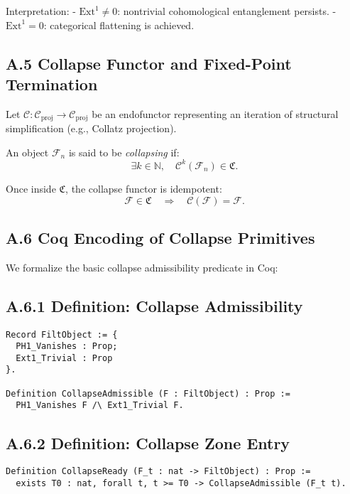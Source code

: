 \documentclass[11pt]{article}
\begin{document}
\noindent Interpretation:
- \( \mathrm{Ext}^1 \neq 0 \): nontrivial cohomological entanglement persists.
- \( \mathrm{Ext}^1 = 0 \): categorical flattening is achieved.

\subsection*{A.5 Collapse Functor and Fixed-Point Termination}

Let \( \mathcal{C} : \mathcal{C}_{\mathrm{proj}} \to \mathcal{C}_{\mathrm{proj}} \) be an endofunctor representing an iteration of structural simplification (e.g., Collatz projection).

An object \( \mathcal{F}_n \) is said to be \emph{collapsing} if:
\[
\exists k \in \mathbb{N}, \quad \mathcal{C}^k(\mathcal{F}_n) \in \mathfrak{C}.
\]

Once inside \( \mathfrak{C} \), the collapse functor is idempotent:
\[
\mathcal{F} \in \mathfrak{C} \quad \Rightarrow \quad \mathcal{C}(\mathcal{F}) = \mathcal{F}.
\]

\subsection*{A.6 Coq Encoding of Collapse Primitives}

We formalize the basic collapse admissibility predicate in Coq:

\subsection*{A.6.1 Definition: Collapse Admissibility}

\begin{lstlisting}[language=Coq]
Record FiltObject := {
  PH1_Vanishes : Prop;
  Ext1_Trivial : Prop
}.

Definition CollapseAdmissible (F : FiltObject) : Prop :=
  PH1_Vanishes F /\ Ext1_Trivial F.
\end{lstlisting}

\subsection*{A.6.2 Definition: Collapse Zone Entry}

\begin{lstlisting}[language=Coq]
Definition CollapseReady (F_t : nat -> FiltObject) : Prop :=
  exists T0 : nat, forall t, t >= T0 -> CollapseAdmissible (F_t t).
\end{lstlisting}
\end{document}
